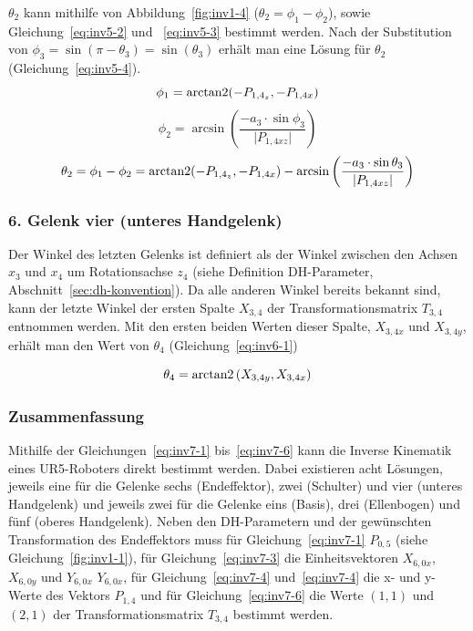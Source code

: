 $\theta_2$ kann mithilfe von Abbildung~\ref{fig:inv1-4} ($\theta_2 = \phi_1 - \phi_2$), sowie Gleichung~\ref{eq:inv5-2} und ~\ref{eq:inv5-3} bestimmt werden.
Nach der Substitution von $\phi_3 = \sin(\pi-\theta_3) = \sin(\theta_3)$ erhält man eine Lösung für $\theta_2$ (Gleichung~\ref{eq:inv5-4}).
\begin{equation}
    \phi_1 = \operatorname{arctan2}(-P_{1,4_z}, -P_{1,4x}) \label{eq:inv5-2}
\end{equation}
\begin{equation}
    \phi_2 = \arcsin\left( \frac{-a_3\cdot \sin \phi_3}{\lvert P_{1,4xz}\rvert} \right) \label{eq:inv5-3}
\end{equation}
\begin{equation}
    \theta_2 = \phi_1 - \phi_2 =
    \operatorname{arctan2}(-P_{1,4_z}, -P_{1,4x}) -
    \arcsin\left( \frac{-a_3\cdot \sin \theta_3}{\lvert P_{1,4xz}\rvert} \right)
    \label{eq:inv5-4}
\end{equation}

\subsubsection{6. Gelenk vier (unteres Handgelenk)}

Der Winkel des letzten Gelenks ist definiert als der Winkel zwischen den Achsen $x_3$ und $x_4$ um Rotationsachse $z_4$ (siehe Definition DH-Parameter, Abschnitt~\ref{sec:dh-konvention}).
Da alle anderen Winkel bereits bekannt sind, kann der letzte Winkel der ersten Spalte $X_{3,4}$ der Transformationsmatrix $T_{3,4}$ entnommen werden.
Mit den ersten beiden Werten dieser Spalte, $X_{3,4x}$ und $X_{3,4y}$, erhält man den Wert von $\theta_4$ (Gleichung~\ref{eq:inv6-1})

\begin{equation}
    \theta_4 = \operatorname{arctan2}\left( X_{3,4y}, X_{3,4x} \right)    \label{eq:inv6-1}
\end{equation}

\subsubsection{Zusammenfassung}

Mithilfe der Gleichungen~\ref{eq:inv7-1} bis~\ref{eq:inv7-6} kann die Inverse Kinematik eines UR5-Roboters direkt bestimmt werden.
Dabei existieren acht Lösungen, jeweils eine für die Gelenke sechs (Endeffektor), zwei (Schulter) und vier (unteres Handgelenk) und jeweils zwei für die Gelenke eins (Basis), drei (Ellenbogen) und fünf (oberes Handgelenk).
Neben den DH-Parametern und der gewünschten Transformation des Endeffektors muss für Gleichung~\ref{eq:inv7-1} $P_{0,5}$ (siehe Gleichung~\ref{fig:inv1-1}), für Gleichung~\ref{eq:inv7-3} die Einheitsvektoren $X_{6,0x}$, $X_{6,0y}$ und $Y_{6,0x}$ $Y_{6,0x}$, für Gleichung~\ref{eq:inv7-4} und~\ref{eq:inv7-4} die x- und y-Werte des Vektors $P_{1,4}$ und für Gleichung~\ref{eq:inv7-6} die Werte $(1,1)$ und $(2,1)$ der Transformationsmatrix $T_{3,4}$ bestimmt werden.

